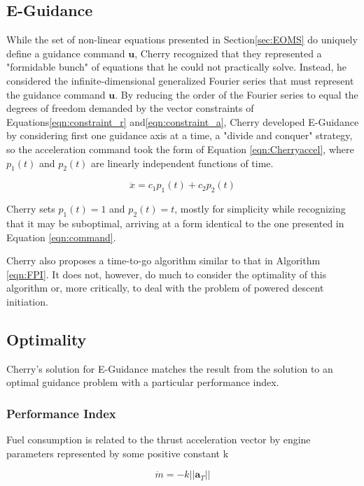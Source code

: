 \subsection{E-Guidance}
While the set of non-linear equations presented in Section\:\ref{sec:EOMS} do uniquely define a guidance command $\bm{u}$, Cherry recognized that they represented a "formidable bunch" of equations that he could not practically solve. Instead, he considered the infinite-dimensional generalized Fourier series that must represent the guidance command $\bm{u}$. By reducing the order of the Fourier series to equal the degrees of freedom demanded by the vector constraints of Equations\:\ref{eqn:constraint_r} and\:\ref{eqn:constraint_a}, Cherry developed E-Guidance by considering first one guidance axis at a time, a "divide and conquer" strategy, so the acceleration command took the form of Equation \ref{eqn:Cherryaccel}, where $p_1(t)$ and $p_2(t)$ are linearly independent functions of time.

\begin{equation}
\label{eqn:Cherryaccel}
\ddot{x} = c_1p_1(t) + c_2p_2(t)
\end{equation}

Cherry sets $p_1(t) = 1$ and $p_2(t) = t$, mostly for simplicity while recognizing that it may be suboptimal, arriving at a form identical to the one presented in Equation \ref{eqn:command}. 

Cherry also proposes a time-to-go algorithm similar to that in Algorithm \ref{eqn:FPI}. It does not, however, do much to consider the optimality of this algorithm or, more critically, to deal with the problem of powered descent initiation.

\subsection{Optimality} \label{sec:optimality}
Cherry's solution for E-Guidance matches the result from the solution to an optimal guidance problem with a particular performance index.

\subsubsection{Performance Index}
Fuel consumption is related to the thrust acceleration vector by engine parameters represented by some positive constant k

\begin{equation}
\label{eqn:fuel_rate}
\dot{m} = -k ||\bm{a}_T||
\end{equation}

